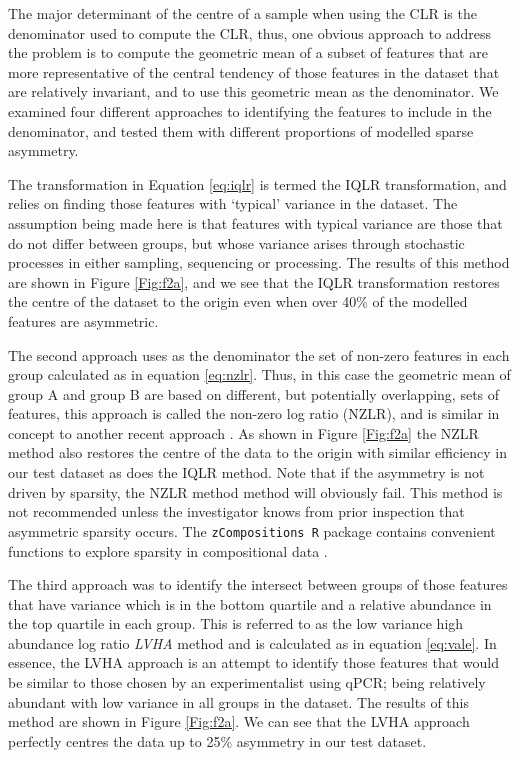 \documentclass[graybox]{svmult}
\begin{document}
The major determinant of the centre of a sample when using the CLR is the denominator used to compute the CLR, thus, one obvious approach to address the problem is to compute the geometric mean of a subset of features that are more representative of the central tendency of those features in the dataset that are relatively invariant, and to use this geometric mean as the denominator. We  examined four different approaches to identifying the features to include in the denominator, and tested them with different proportions of modelled sparse asymmetry.

The transformation in Equation \ref{eq:iqlr} is termed the IQLR transformation, and relies on finding those features with `typical' variance in the dataset. The assumption being made here is that features with typical variance are those that do not differ between groups, but whose variance arises through stochastic processes in either sampling, sequencing or processing. The results of this method are shown in Figure \ref{Fig:f2a}, and we see that the IQLR transformation restores the centre of the dataset to the origin even when over 40\% of the modelled features are asymmetric.

The second approach uses as the denominator the set of non-zero features in each group calculated as in equation \ref{eq:nzlr}.  Thus, in this case the geometric mean of group A and group B are based on different, but potentially overlapping, sets of features, this approach is called the non-zero log ratio (NZLR), and is similar in concept to another recent approach \cite{Martino:2019aa}. As shown in Figure \ref{Fig:f2a} the NZLR method also restores the centre of the data to the origin with similar efficiency in our test dataset as does the IQLR method. Note that if the asymmetry is not driven by sparsity, the NZLR method method will obviously fail. This method is not recommended unless the investigator knows from prior inspection  that asymmetric sparsity occurs.   The \texttt{zCompositions R} package contains convenient functions to explore sparsity in compositional data \cite{PalareaAlbaladejo201585}.

The third approach was to identify the intersect between groups of those features that have variance which is in the bottom quartile  and a relative abundance in the top quartile in each group. This is referred to as the low variance high abundance log ratio  \textit{LVHA} method and is calculated as in equation \ref{eq:vale}. In essence, the LVHA approach is an attempt to identify those features that would be similar to those chosen by an experimentalist using qPCR; being relatively abundant with low variance in all groups in the dataset.  The results of this method are shown in Figure \ref{Fig:f2a}. We can see that the LVHA approach perfectly centres the data up to 25\% asymmetry in our test dataset.  
\end{document}
